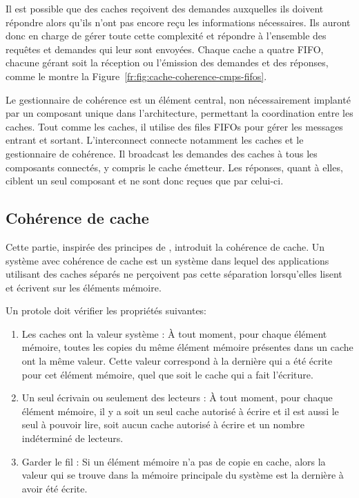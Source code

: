 Il est possible que des caches reçoivent des demandes auxquelles ils doivent répondre alors qu'ils
n'ont pas encore reçu les informations nécessaires.
Ils auront donc en charge de gérer toute cette complexité et répondre à l'ensemble des requêtes et demandes qui leur sont envoyées.
Chaque cache a quatre  FIFO, chacune gérant soit la réception ou l'émission
des demandes et des réponses, comme le montre la
Figure~\ref{fr:fig:cache-coherence-cmps-fifos}.

Le gestionnaire de cohérence est un élément central, non nécessairement implanté par un composant unique dans l'architecture,
permettant la coordination entre les caches.
Tout comme les caches, il utilise des files FIFOs pour
gérer les messages entrant et sortant.
L'interconnect connecte notamment les caches et le gestionnaire de
cohérence. Il broadcast les demandes des caches à tous les composants connectés,
y compris le cache émetteur. Les réponses, quant à elles, ciblent
un seul composant et ne sont donc reçues que par celui-ci.

\subsection{Cohérence de cache}
\label{fr:sec:cache_coherence_msi}
Cette partie, inspirée des principes de \cite{Sorin:2011:PMC:2028905},
introduit la cohérence de cache.
Un système avec cohérence de cache est un système dans lequel des applications
utilisant des caches séparés ne perçoivent pas cette séparation lorsqu'elles
lisent et écrivent sur les éléments mémoire.
\begin{property}
  \label{fr:prop:system_wide_value}
Un protole doit vérifier les propriétés suivantes:
\begin{enumerate}
   \setlength{\itemsep}{0pt}%
   \setlength{\parskip}{0pt}%
  \item Les caches ont la valeur système :
    À tout moment, pour chaque élément mémoire, toutes les copies du même élément
mémoire présentes dans un cache ont la même valeur. Cette valeur correspond à
la dernière qui a été écrite pour cet élément mémoire, quel que soit le cache
qui a fait l'écriture.
  \item
    Un seul écrivain ou seulement des lecteurs :
    À tout moment, pour chaque élément mémoire, il y a soit un seul cache autorisé
à écrire et il est aussi le seul à pouvoir lire, soit aucun cache autorisé à
écrire et un nombre indéterminé de lecteurs.
\item
  Garder le fil :
Si un élément mémoire n'a pas de copie en cache, alors la valeur qui se trouve
dans la mémoire principale du système est la dernière à avoir été écrite.
\end{enumerate}
\end{property}



